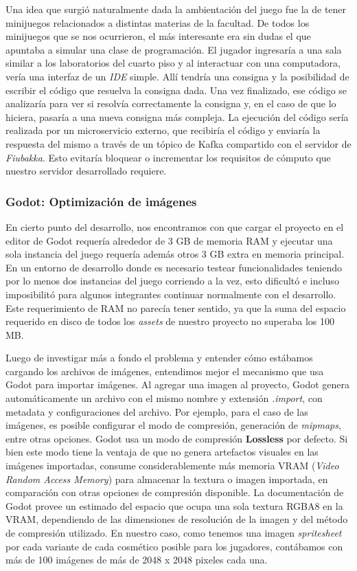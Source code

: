 \noindent Una idea que surgió naturalmente dada la ambientación del juego fue la de tener minijuegos relacionados a distintas materias
de la facultad. De todos los minijuegos que se nos ocurrieron, el más interesante era sin dudas el que apuntaba a simular
una clase de programación. El jugador ingresaría a una sala similar a los laboratorios del cuarto piso y al interactuar con una
computadora, vería una interfaz de un \textit{IDE} simple. Allí tendría una consigna y la posibilidad de escribir el código que resuelva la consigna dada.
Una vez finalizado, ese código se analizaría para ver si resolvía correctamente la consigna y, en el caso de que lo hiciera, pasaría a una nueva
consigna más compleja. La ejecución del código sería realizada por un microservicio externo, que recibiría el código y enviaría la respuesta del mismo a través de
un tópico de Kafka compartido con el servidor de \textit{Fiubakka}. Esto evitaría bloquear o incrementar los requisitos de cómputo que nuestro servidor desarrollado requiere.

\subsubsection{Godot: Optimización de imágenes}

\noindent En cierto punto del desarrollo, nos encontramos con que cargar el proyecto en el editor de Godot
requería alrededor de 3 GB de memoria RAM y ejecutar una sola instancia del juego requería además
otros 3 GB extra en memoria principal. En un entorno de desarrollo donde es necesario testear
funcionalidades teniendo por lo menos dos instancias del juego corriendo a la vez, esto dificultó e incluso
imposibilitó para algunos integrantes continuar normalmente con el desarrollo. Este requerimiento
de RAM no parecía tener sentido, ya que la suma del espacio requerido en disco de todos los 
\textit{assets} de nuestro proyecto no superaba los 100 MB.

Luego de investigar más a fondo el problema y entender cómo estábamos cargando los archivos de imágenes,
entendimos mejor el mecanismo que usa Godot para importar imágenes.
Al agregar una imagen al proyecto, Godot genera automáticamente un archivo con el mismo nombre y extensión
\textit{.import}, con metadata y configuraciones del archivo. 
Por ejemplo, para el caso de las imágenes, es posible configurar el modo de compresión, generación de 
\textit{mipmaps}, entre otras opciones. Godot usa un modo de compresión \textbf{Lossless} por defecto. 
Si bien este modo tiene la ventaja de que no genera artefactos visuales en las imágenes importadas, consume 
considerablemente más memoria VRAM (\textit{Video Random Access Memory}) para almacenar la textura o
imagen importada, en comparación con otras opciones de compresión disponible.
La documentación de Godot\cite{ref2} provee un estimado del espacio que ocupa una sola textura
RGBA8 en la VRAM, dependiendo de las dimensiones de resolución de la imagen y del método de compresión utilizado.
En nuestro caso, como tenemos una imagen \textit{spritesheet} por cada variante de cada cosmético posible para los jugadores,
contábamos con más de 100 imágenes de más de 2048 x 2048 pixeles cada una. 


